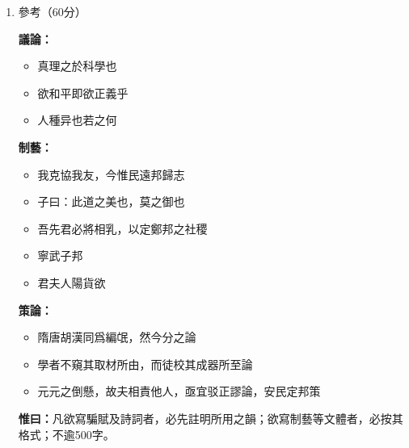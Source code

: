 \documentclass[12pt,a4paper]{article}
\begin{document}
\begin{enumerate}[leftmargin=*, label=\textbf{\arabic*.}, start=23]
    \item 參考（60分）
    
    \textbf{議論：}
    \begin{itemize}[leftmargin=2em, itemsep=0.5ex, parsep=0.5ex]
        \item 真理之於科學也
        \item 欲和平即欲正義乎
        \item 人種异也若之何
    \end{itemize}
    
    \textbf{制藝：}
    \begin{itemize}[leftmargin=2em, itemsep=0.5ex, parsep=0.5ex]
        \item 我克協我友，今惟民遠邦歸志
        \item 子曰：此道之美也，莫之御也
        \item 吾先君必將相乳，以定鄭邦之社稷
        \item 寧武子邦
        \item 君夫人陽貨欲
    \end{itemize}
    
    \textbf{策論：}
    \begin{itemize}[leftmargin=2em, itemsep=0.5ex, parsep=0.5ex]
        \item 隋唐胡漢同爲編氓，然今分之論
        \item 學者不窺其取材所由，而徒校其成器所至論
        \item 元元之倒懸，故夫相責他人，亟宜驳正謬論，安民定邦策
    \end{itemize}
    
    \vspace{1em}
    
    \textbf{惟曰：}凡欲寫騙賦及詩詞者，必先註明所用之韻；欲寫制藝等文體者，必按其格式；不逾500字。
    
    \vspace{25em}
\end{enumerate}
\end{document}
